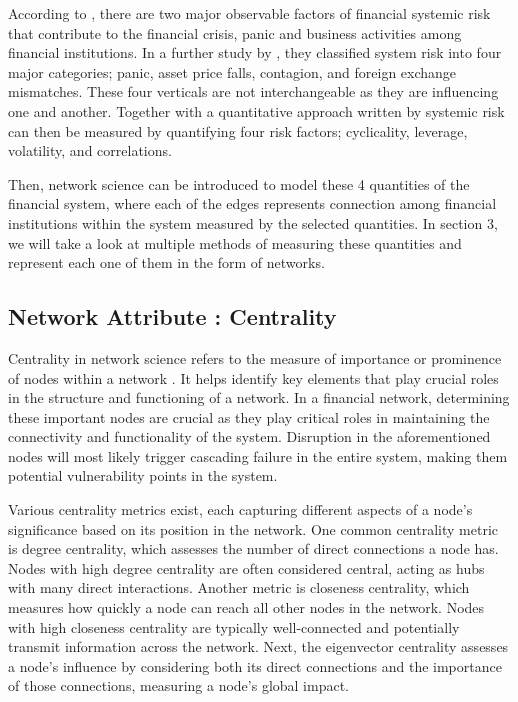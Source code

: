 \documentclass[a4paper,11pt]{article}
\begin{document}
According to \cite{Allen_Babus_Carletti_2009}, there are two major observable factors of financial systemic risk that contribute to the financial crisis, panic and business activities among financial institutions. In a further study by \cite{Allen_Carletti_2013}, they classified system risk into four major categories; panic, asset price falls, contagion, and foreign exchange mismatches. These four verticals are not interchangeable as they are influencing one and another. Together with a quantitative approach written by \cite{Roukny_Battiston_Stiglitz_2016} systemic risk can then be measured by quantifying four risk factors; cyclicality, leverage, volatility, and correlations.

Then, network science can be introduced to model these 4 quantities of the financial system, where each of the edges represents connection among financial institutions within the system measured by the selected quantities. In section 3, we will take a look at multiple methods of measuring these quantities and represent each one of them in the form of networks.

\subsection{Network Attribute : Centrality}
Centrality in network science refers to the measure of importance or prominence of nodes within a network \citep{Barabasi_Posfai_2017}. It helps identify key elements that play crucial roles in the structure and functioning of a network. In a financial network, determining these important nodes are crucial as they play critical roles in maintaining the connectivity and functionality of the system. Disruption in the aforementioned nodes will most likely trigger cascading failure in the entire system, making them potential vulnerability points in the system.

Various centrality metrics exist, each capturing different aspects of a node’s significance based on its position in the network. One common centrality metric is degree centrality, which assesses the number of direct connections a node has. Nodes with high degree centrality are often considered central, acting as hubs with many direct interactions. Another metric is closeness centrality, which measures how quickly a node can reach all other nodes in the network. Nodes with high closeness centrality are typically well-connected and potentially transmit information across the network. Next, the eigenvector centrality assesses a node’s influence by considering both its direct connections and the importance of those connections, measuring a node’s global impact.
\end{document}

